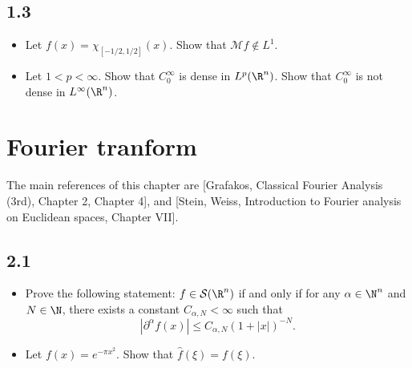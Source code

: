 \subsection*{1.3}
\begin{itemize}
    \item[1.]Let $f(x)=\chi_{[-1/2,1/2]}(x)$. Show that $\mathcal{M}f\notin L^1$.
    
    \item[2.]Let $1<p<\infty$. Show that $C_0^\infty$ is dense in $L^p(\R^n)$.
    Show that $C_0^\infty$ is not dense in $L^\infty(\R^n)$.
\end{itemize}

\section{Fourier tranform}
The main references of this chapter are [Grafakos, Classical Fourier Analysis
(3rd), Chapter 2, Chapter 4], and [Stein, Weiss, Introduction to Fourier analysis
on Euclidean spaces, Chapter VII].

\subsection*{2.1}
\begin{itemize}
    \item[1.]Prove the following statement: $f\in\mathcal{S}(\R^n)$ if and only if
    for any $\alpha\in\N^n$ and $N\in\N$, there exists a constant $C_{\alpha,N}<\infty$ such that
    $$|\partial^\alpha f(x)|\le C_{\alpha,N}(1+|x|)^{-N}.$$

    \item[2.]Let $f(x)=e^{-\pi x^2}$. Show that $\hat{f}(\xi)=f(\xi)$.

\end{itemize}
